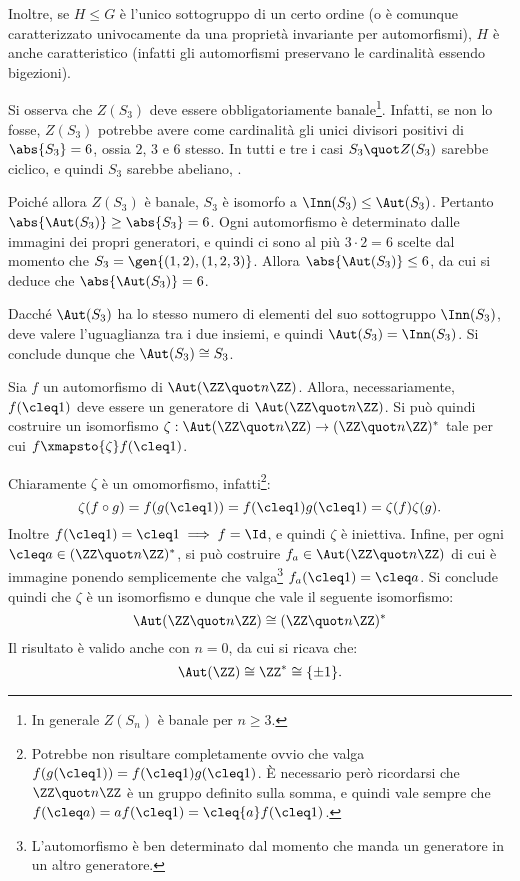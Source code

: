 \documentclass[12pt]{scrartcl}
\begin{document}
	
	Inoltre, se $H \leq G$ è l'unico sottogruppo di un certo ordine (o è comunque
	caratterizzato univocamente da una proprietà invariante per automorfismi),
	$H$ è anche caratteristico (infatti gli automorfismi preservano le cardinalità essendo
	bigezioni). \bigskip
	
	
	\begin{example}
		Si osserva che $Z(S_3)$ deve essere obbligatoriamente
		banale\footnote{
			In generale $Z(S_n)$ è banale per $n \geq 3$.
		}. Infatti, se non lo fosse, $Z(S_3)$ potrebbe
		avere come cardinalità gli unici divisori positivi di
		$\abs{S_3} = 6$, ossia $2$, $3$ e $6$ stesso. In tutti
		e tre i casi $S_3 \quot Z(S_3)$ sarebbe ciclico, e quindi
		$S_3$ sarebbe abeliano, \Lightning. \medskip
		
		
		Poiché allora $Z(S_3)$ è banale, $S_3$ è isomorfo a
		$\Inn(S_3) \leq \Aut(S_3)$. Pertanto $\abs{\Aut(S_3)} \geq \abs{S_3} = 6$. Ogni automorfismo è
		determinato dalle immagini dei propri generatori, e quindi
		ci sono al più $3 \cdot 2 = 6$ scelte dal momento che
		$S_3 = \gen{(1,2), (1,2,3)}$. Allora
		$\abs{\Aut(S_3)} \leq 6$, da cui si deduce che
		$\abs{\Aut(S_3)} = 6$. \medskip
		
		
		Dacché $\Aut(S_3)$ ha lo stesso numero di elementi
		del suo sottogruppo $\Inn(S_3)$, deve valere l'uguaglianza
		tra i due insiemi, e quindi $\Aut(S_3) = \Inn(S_3)$. Si
		conclude dunque che $\Aut(S_3) \cong S_3$.
	\end{example}
	
	
	\begin{example}
		Sia $f$ un automorfismo di $\Aut(\ZZ \quot n \ZZ)$. Allora,
		necessariamente, $f(\cleq1)$ deve essere un
		generatore di $\Aut(\ZZ \quot n \ZZ)$. Si può quindi costruire
		un isomorfismo $\zeta : \Aut(\ZZ \quot n \ZZ) \to
		(\ZZ \quot n \ZZ)^*$ tale per cui
		$f \xmapsto{\zeta} f(\cleq1)$. \medskip
		
		
		Chiaramente $\zeta$ è un omomorfismo, infatti\footnote{
			Potrebbe non risultare completamente ovvio che
			valga $f(g(\cleq 1)) = f(\cleq 1) g(\cleq 1)$.
			È necessario però ricordarsi che $\ZZ\quot n \ZZ$ è
			un gruppo definito sulla somma, e quindi vale sempre
			che $f(\cleq a) = a f(\cleq 1) = \cleq{a} f(\cleq 1)$.
		}:
		\[ \zeta(f \circ g) = f(g(\cleq 1)) = f(\cleq 1) g(\cleq 1) = \zeta(f) \zeta(g). \]
		Inoltre $f(\cleq 1) = \cleq 1 \implies f = \Id$, e quindi
		$\zeta$ è iniettiva. Infine, per ogni $\cleq a \in (\ZZ \quot n \ZZ)^*$, si può costruire $f_a \in \Aut(\ZZ \quot n \ZZ)$
		di cui è immagine ponendo semplicemente che valga\footnote{
			L'automorfismo è ben determinato dal momento che manda
			un generatore in un altro generatore.
		}
		$f_a(\cleq 1) = \cleq a$. Si conclude quindi che
		$\zeta$ è un isomorfismo e dunque che vale il seguente
		isomorfismo:
		\[ \Aut(\ZZ \quot n \ZZ) \cong (\ZZ \quot n \ZZ)^* \]
		Il risultato è valido anche con $n = 0$, da cui si
		ricava che:
		\[ \Aut(\ZZ) \cong \ZZ^* \cong \{\pm 1\}. \]
	\end{example}
	
\end{document}

